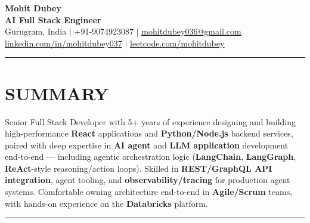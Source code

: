 \documentclass[a4paper]{article}
\newcommand{\sectionline}{
\begin{center}
\vspace{-10pt}
\rule{1\textwidth}{0.5pt}
\end{center}
\vspace{1pt}
}
\begin{document}
\begin{center}
    \textbf{\Huge Mohit Dubey} \\ \vspace{4pt}
    \textbf{AI Full Stack Engineer } \\ \vspace{6pt}
    \small Gurugram, India $|$ +91-9074923087 $|$ \href{mailto:mohitdubey036@gmail.com}{\underline{mohitdubey036@gmail.com}} \\
    \href{https://www.linkedin.com/in/mohit-dubey-037/}{\underline{linkedin.com/in/mohitdubey037}} $|$ \href{https://leetcode.com/u/mohitdubey037/}
    {\underline{leetcode.com/mohitdubey}}
\end{center}


\sectionline
\section*{SUMMARY}
Senior Full Stack Developer with 5+ years of experience designing and building high-performance \textbf{React} applications and \textbf{Python/Node.js} backend services, paired with deep expertise in \textbf{AI agent} and \textbf{LLM application} development end-to-end — including agentic orchestration logic (\textbf{LangChain}, \textbf{LangGraph}, \textbf{ReAct}-style reasoning/action loops). Skilled in \textbf{REST/GraphQL API integration}, agent tooling, and \textbf{observability/tracing} for production agent systems. Comfortable owning architecture end-to-end in \textbf{Agile/Scrum} teams, with hands-on experience on the \textbf{Databricks} platform.

\sectionline
\end{document}
